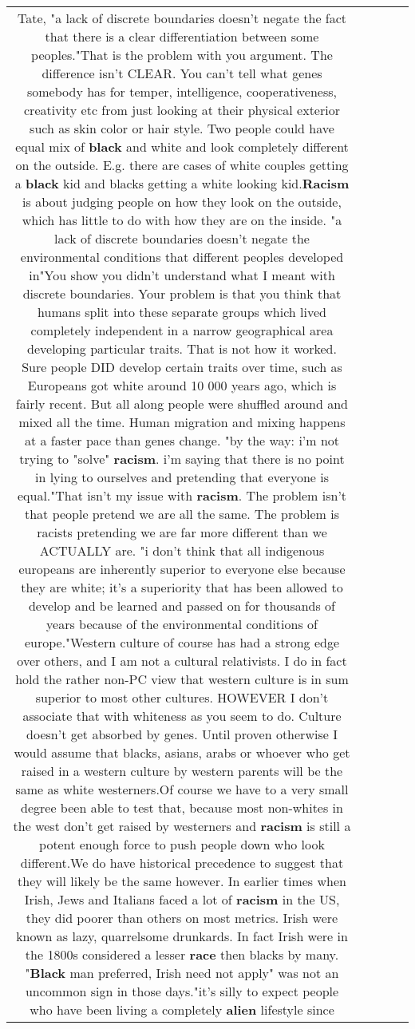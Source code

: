 \documentclass[11pt]{article}
\newlength\mylength
\begin{document}
\begin{center}
\begin{longtable}{|C{.65\mylength}|C{.30\mylength}|C{.12\mylength}|C{.12\mylength}|C{.12\mylength}|}
  \small Tate, "a lack of discrete boundaries doesn't negate the fact that there is a clear differentiation between some peoples."That is the problem with you argument. The difference isn't CLEAR. You can't tell what genes somebody has for temper, intelligence, cooperativeness, creativity etc from just looking at their physical exterior such as skin color or hair style. Two people could have equal mix of \textbf{black} and white and look completely different on the outside. E.g. there are cases of white couples getting a \textbf{black} kid and blacks getting a white looking kid.\textbf{Racism} is about judging people on how they look on the outside, which has little to do with how they are on the inside. "a lack of discrete boundaries doesn't negate the environmental conditions that different peoples developed in"You show you didn't understand what I meant with discrete boundaries. Your problem is that you think that humans split into these separate groups which lived completely independent in a narrow geographical area developing particular traits. That is not how it worked. Sure people DID develop certain traits over time, such as Europeans got white around 10 000 years ago, which is fairly recent. But all along people were shuffled around and mixed all the time. Human migration and mixing happens at a faster pace than genes change. "by the way: i'm not trying to "solve" \textbf{racism}. i'm saying that there is no point in lying to ourselves and pretending that everyone is equal."That isn't my issue with \textbf{racism}. The problem isn't that people pretend we are all the same. The problem is racists pretending we are far more different than we ACTUALLY are. "i don't think that all indigenous europeans are inherently superior to everyone else because they are white; it's a superiority that has been allowed to develop and be learned and passed on for thousands of years because of the environmental conditions of europe."Western culture of course has had a strong edge over others, and I am not a cultural relativists. I do in fact hold the rather non-PC view that western culture is in sum superior to most other cultures. HOWEVER I don't associate that with whiteness as you seem to do. Culture doesn't get absorbed by genes. Until proven otherwise I would assume that blacks, asians, arabs or whoever who get raised in a western culture by western parents will be the same as white westerners.Of course we have to a very small degree been able to test that, because most non-whites in the west don't get raised by westerners and \textbf{racism} is still a potent enough force to push people down who look different.We do have historical precedence to suggest that they will likely be the same however. In earlier times when Irish, Jews and Italians faced a lot of \textbf{racism} in the US, they did poorer than others on most metrics. Irish were known as lazy, quarrelsome drunkards. In fact Irish were in the 1800s considered a lesser \textbf{race} then blacks by many. "\textbf{Black} man preferred, Irish need not apply" was not an uncommon sign in those days."it's silly to expect people who have been living a completely \textbf{alien} lifestyle since 
\end{longtable}
\end{center}
\end{document}
